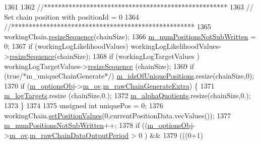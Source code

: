 \begin{DoxyCode}
1361 
1362   \textcolor{comment}{//****************************************************}
1363   \textcolor{comment}{// Set chain position with positionId = 0}
1364   \textcolor{comment}{//****************************************************}
1365   workingChain.\hyperlink{class_q_u_e_s_o_1_1_base_vector_sequence_adc238af7f6e8af2402ab791de7d60af5}{resizeSequence}(chainSize);
1366   \hyperlink{class_q_u_e_s_o_1_1_metropolis_hastings_s_g_a60695940f442f6568d10ee9e456032c7}{m\_numPositionsNotSubWritten} = 0;
1367   \textcolor{keywordflow}{if} (workingLogLikelihoodValues) workingLogLikelihoodValues->\hyperlink{class_q_u_e_s_o_1_1_scalar_sequence_a2aa8d77c39927060227275b12b6d3dd0}{resizeSequence}(chainSize);
1368   \textcolor{keywordflow}{if} (workingLogTargetValues    ) workingLogTargetValues->\hyperlink{class_q_u_e_s_o_1_1_scalar_sequence_a2aa8d77c39927060227275b12b6d3dd0}{resizeSequence}    (chainSize);
1369   \textcolor{keywordflow}{if} (\textcolor{keyword}{true}\textcolor{comment}{/*m\_uniqueChainGenerate*/}) \hyperlink{class_q_u_e_s_o_1_1_metropolis_hastings_s_g_ad1916a22b4a53ba67fa87f93c6e0a252}{m\_idsOfUniquePositions}.resize(chainSize,0);
1370   \textcolor{keywordflow}{if} (\hyperlink{class_q_u_e_s_o_1_1_metropolis_hastings_s_g_a5d0bc9f73d50d272aa6bfb5ef5939ef3}{m\_optionsObj}->\hyperlink{class_q_u_e_s_o_1_1_metropolis_hastings_s_g_options_a9d4792d9fc2dc5439b8ab489b0c236eb}{m\_ov}.\hyperlink{class_q_u_e_s_o_1_1_mh_options_values_a9d540978290d39df801e32f183450859}{m\_rawChainGenerateExtra}) \{
1371     \hyperlink{class_q_u_e_s_o_1_1_metropolis_hastings_s_g_ac33a6e46e05c20c071a46ecf58a9291c}{m\_logTargets}.resize    (chainSize,0.);
1372     \hyperlink{class_q_u_e_s_o_1_1_metropolis_hastings_s_g_a6fd65985afd80114ece8b2b5fffe658d}{m\_alphaQuotients}.resize(chainSize,0.);
1373   \}
1374 
1375   \textcolor{keywordtype}{unsigned} \textcolor{keywordtype}{int} uniquePos = 0;
1376   workingChain.\hyperlink{class_q_u_e_s_o_1_1_base_vector_sequence_a5bcce98b68e0e24c05136e7a3bb50c12}{setPositionValues}(0,currentPositionData.vecValues());
1377   \hyperlink{class_q_u_e_s_o_1_1_metropolis_hastings_s_g_a60695940f442f6568d10ee9e456032c7}{m\_numPositionsNotSubWritten}++;
1378   \textcolor{keywordflow}{if} ((\hyperlink{class_q_u_e_s_o_1_1_metropolis_hastings_s_g_a5d0bc9f73d50d272aa6bfb5ef5939ef3}{m\_optionsObj}->\hyperlink{class_q_u_e_s_o_1_1_metropolis_hastings_s_g_options_a9d4792d9fc2dc5439b8ab489b0c236eb}{m\_ov}.\hyperlink{class_q_u_e_s_o_1_1_mh_options_values_ad838a3095d5158e27b9af55597822d31}{m\_rawChainDataOutputPeriod}           > 
       0  ) &&
1379       (((0+1) %

\end{DoxyCode}
